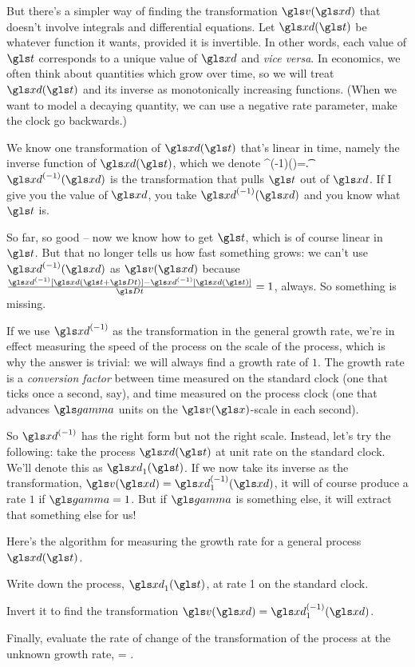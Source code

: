 But there's a simpler way of finding the transformation $\gv(\xd)$ that doesn't involve integrals and differential equations. Let $\xd(\t)$ be whatever function it wants, provided it is invertible. In other words, each value of $\t$ corresponds to a unique value of $\xd$ and \textit{vice versa}. In economics, we often think about quantities which grow over time, so we will treat $\xd(\t)$ and its inverse as monotonically increasing functions. (When we want to model a decaying quantity, we can use a negative rate parameter, \ie make the clock go backwards.)

We know one transformation of $\xd(\t)$ that's linear in time, namely the inverse function of $\xd(\t)$, which we denote 
\be
\xd^{(-1)}(\xd)=\t.
\ee
$\xd^{(-1)}(\xd)$ is the transformation that pulls $\t$ out of $\xd$. If I give you the value of $\xd$, you take  $\xd^{(-1)}(\xd)$ and you know what $\t$ is.

So far, so good -- now we know how to get $\t$, which is of course linear in $\t$. But that no longer tells 
us how fast something grows: we can't use $\xd^{(-1)}(\xd)$ as $\gv(\xd)$ because 
$\frac{\xd^{(-1)}[\xd(\t+\Dt)]-\xd^{(-1)}[\xd(\t)]}{\Dt}=1$, always. So something is missing.

If we use $\xd^{(-1)}$ as the transformation in the general growth rate, we're in effect measuring the 
speed of the process on the scale of the process, which is why the answer is trivial: we will always 
find a growth rate of $1$.  The growth rate is a {\it conversion factor} between time measured on 
the standard clock (one that ticks once a second, say), and time measured on the process clock 
(one that advances $\ggamma$ units on the $\gv(\x)$-scale in each second). 

So $\xd^{(-1)}$ has the right form but not the right scale. Instead, let's try the following: take the process 
$\xd(\t)$ at unit rate on the standard clock. We'll denote this as $\xd_1(\t)$. If we now take its inverse as 
the transformation,  $\gv(\xd)=\xd_1^{(-1)}(\xd)$, it will of course produce a rate $1$ if $\ggamma=1$. 
But if $\ggamma$ is something else, it will extract that something else for us!

Here's the algorithm for measuring the growth rate for a general process $\xd(\t)$.
\bi
\item
Write down the process, $\xd_1(\t)$, at rate 1 on the standard clock.
\item
Invert it to find the transformation $\gv(\xd) = \xd_1^{(-1)}(\xd)$.
\item
Finally, evaluate the rate of change of the transformation of the process at the unknown growth rate, 
\be
\g = \frac{\gv(\xd(\t+\Dt)) - \gv(\xd(\t))}{\Dt}.
\ee
\ei

